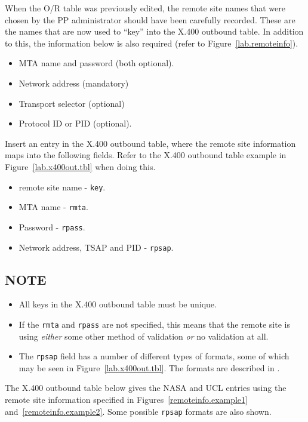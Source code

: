 When the O/R table was previously edited, the remote site names that
were chosen by the PP administrator should have been carefully
recorded. These are the names that are now used to ``key'' into the
X.400 outbound table.  In addition to this, the information below is
also required (refer to Figure~\ref{lab.remoteinfo}).
\begin{itemize}
\item MTA name and password (both optional).
\item Network address (mandatory)
\item Transport selector (optional)
\item Protocol ID or PID (optional).
\end{itemize}

Insert an entry in the X.400 outbound table, 
where the remote site information maps into the following fields. 
Refer to the X.400 outbound table example in Figure~\ref{lab.x400out.tbl} 
when doing this.

\begin{itemize}
\item remote site name - \verb|key|.
\item MTA name - \verb|rmta|.
\item Password - \verb|rpass|.
\item Network address, TSAP and PID - \verb|rpsap|.
\end{itemize}

\subsection*{NOTE}

\begin{itemize}

\item All keys in the X.400 outbound table must be unique.

\item If the \verb|rmta| and \verb|rpass| are not specified, this
means that the remote site is using {\em either} some other method 
of validation {\em or} no validation at all.

\item The \verb|rpsap| field has a number of different types of formats, 
some of which may be seen in Figure~\ref{lab.x400out.tbl}.
The formats are described in \cite{String.Addresses}.

\end{itemize}

The X.400 outbound table below gives the NASA and UCL entries using
the remote site information specified in Figures~\ref{remoteinfo.example1}
and~\ref{remoteinfo.example2}. Some possible \verb|rpsap| formats are also
shown.

